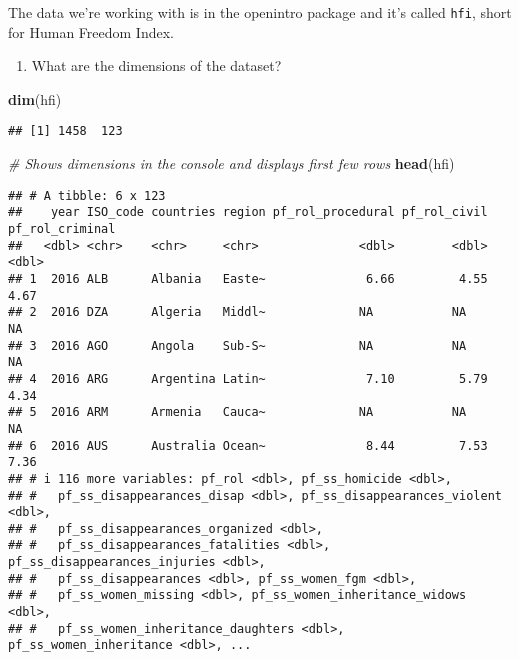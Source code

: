 \documentclass[
]{article}
\newenvironment{Shaded}{\begin{snugshade}}{\end{snugshade}}
\newcommand{\CommentTok}[1]{\textcolor[rgb]{0.56,0.35,0.01}{\textit{#1}}}
\newcommand{\FunctionTok}[1]{\textcolor[rgb]{0.13,0.29,0.53}{\textbf{#1}}}
\newcommand{\NormalTok}[1]{#1}
\providecommand{\tightlist}{%
  \setlength{\itemsep}{0pt}\setlength{\parskip}{0pt}}
\begin{document}
The data we're working with is in the openintro package and it's called
\texttt{hfi}, short for Human Freedom Index.

\begin{enumerate}
\def\labelenumi{\arabic{enumi}.}
\tightlist
\item
  What are the dimensions of the dataset?
\end{enumerate}

\begin{Shaded}
\begin{Highlighting}[]
\FunctionTok{dim}\NormalTok{(hfi)}
\end{Highlighting}
\end{Shaded}

\begin{verbatim}
## [1] 1458  123
\end{verbatim}

\begin{Shaded}
\begin{Highlighting}[]
\CommentTok{\# Shows dimensions in the console and displays first few rows}
\FunctionTok{head}\NormalTok{(hfi)}
\end{Highlighting}
\end{Shaded}

\begin{verbatim}
## # A tibble: 6 x 123
##    year ISO_code countries region pf_rol_procedural pf_rol_civil pf_rol_criminal
##   <dbl> <chr>    <chr>     <chr>              <dbl>        <dbl>           <dbl>
## 1  2016 ALB      Albania   Easte~              6.66         4.55            4.67
## 2  2016 DZA      Algeria   Middl~             NA           NA              NA   
## 3  2016 AGO      Angola    Sub-S~             NA           NA              NA   
## 4  2016 ARG      Argentina Latin~              7.10         5.79            4.34
## 5  2016 ARM      Armenia   Cauca~             NA           NA              NA   
## 6  2016 AUS      Australia Ocean~              8.44         7.53            7.36
## # i 116 more variables: pf_rol <dbl>, pf_ss_homicide <dbl>,
## #   pf_ss_disappearances_disap <dbl>, pf_ss_disappearances_violent <dbl>,
## #   pf_ss_disappearances_organized <dbl>,
## #   pf_ss_disappearances_fatalities <dbl>, pf_ss_disappearances_injuries <dbl>,
## #   pf_ss_disappearances <dbl>, pf_ss_women_fgm <dbl>,
## #   pf_ss_women_missing <dbl>, pf_ss_women_inheritance_widows <dbl>,
## #   pf_ss_women_inheritance_daughters <dbl>, pf_ss_women_inheritance <dbl>, ...
\end{verbatim}
\end{document}
